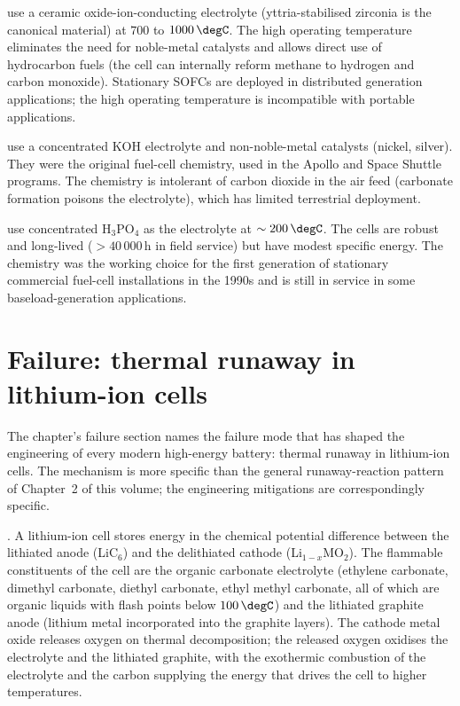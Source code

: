  use a ceramic
oxide-ion-conducting electrolyte (yttria-stabilised zirconia is the
canonical material) at $700$ to $1000\,\degC$. The high operating
temperature eliminates the need for noble-metal catalysts and allows
direct use of hydrocarbon fuels (the cell can internally reform
methane to hydrogen and carbon monoxide). Stationary SOFCs are
deployed in distributed generation applications; the high operating
temperature is incompatible with portable applications.

 use a concentrated KOH electrolyte and
non-noble-metal catalysts (nickel, silver). They were the original
fuel-cell chemistry, used in the Apollo and Space Shuttle programs.
The chemistry is intolerant of carbon dioxide in the air feed
(carbonate formation poisons the electrolyte), which has limited
terrestrial deployment.

 use concentrated H$_3$PO$_4$ as
the electrolyte at $\sim 200\,\degC$. The cells are robust and
long-lived ($> 40\,000\,\text{h}$ in field service) but have modest
specific energy. The chemistry was the working choice for the first
generation of stationary commercial fuel-cell installations in the
1990s and is still in service in some baseload-generation
applications.

\section{Failure: thermal runaway in lithium-ion cells}

The chapter's failure section names the failure mode that has shaped
the engineering of every modern high-energy battery: thermal runaway
in lithium-ion cells. The mechanism is more specific than the general
runaway-reaction pattern of Chapter~2 of this volume; the engineering
mitigations are correspondingly specific.

. A lithium-ion cell stores energy in the
chemical potential difference between the lithiated anode (LiC$_6$)
and the delithiated cathode (Li$_{1-x}$MO$_2$). The flammable
constituents of the cell are the organic carbonate electrolyte
(ethylene carbonate, dimethyl carbonate, diethyl carbonate, ethyl
methyl carbonate, all of which are organic liquids with flash points
below $100\,\degC$) and the lithiated graphite anode (lithium metal
incorporated into the graphite layers). The cathode metal oxide
releases oxygen on thermal decomposition; the released oxygen
oxidises the electrolyte and the lithiated graphite, with the
exothermic combustion of the electrolyte and the carbon supplying the
energy that drives the cell to higher temperatures.

